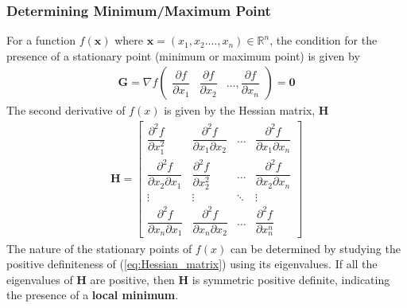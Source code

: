 \subsubsection*{Determining Minimum/Maximum Point}
For a function $f(\textbf{x})$ where $\textbf{x} = (x_1,x_2. \dots, x_n) \in \mathbb{R}^n$, the condition for the presence of a stationary point (minimum or maximum point) is given by
\begin{align}
    \label{eq:grad_f_x}
    \textbf{G} = \nabla f \begin{pmatrix}
        \dfrac{\partial f}{\partial x_1} & \dfrac{\partial f}{\partial x_2} & \dots , \dfrac{\partial f}{\partial x_n}
    \end{pmatrix} = \textbf{0}
\end{align}
The second derivative of $f(x)$ is given by the Hessian matrix, $\textbf{H}$
\begin{align}
    \label{eq:Hessian_matrix}
    \textbf{H} = \begin{bmatrix}
        \dfrac{\partial^2 f}{\partial x_1^2} & \dfrac{\partial^2 f}{\partial x_1 \partial x_2} & \dots & \dfrac{\partial^2 f}{\partial x_1 \partial x_n} \\
        \dfrac{\partial^2 f}{\partial x_2\partial x_1} & \dfrac{\partial^2 f}{\partial x_2^2} & \dots & \dfrac{\partial^2 f}{\partial x_2 \partial x_n} \\
        \vdots & \vdots & \ddots & \vdots \\
        \dfrac{\partial^2 f}{\partial x_n\partial x_1} & \dfrac{\partial^2 f}{\partial x_n \partial x_2} & \dots & \dfrac{\partial^2 f}{\partial x_n^n}
    \end{bmatrix}
\end{align}
The nature of the stationary points of $f(x)$ can be determined by studying the positive definiteness of (\ref{eq:Hessian_matrix}) using its eigenvalues. If all the eigenvalues of $\textbf{H}$ are positive, then $\textbf{H}$ is symmetric positive definite, indicating the presence of a \textbf{local minimum}.
